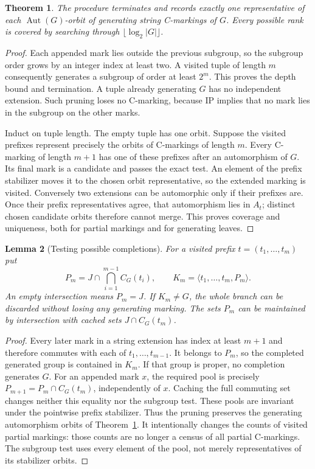 \documentclass[11pt,a4paper]{article}
\newtheorem{theorem}{Theorem}
\newtheorem{lemma}[theorem]{Lemma}
\newcommand{\gen}[1]{\langle#1\rangle}
\begin{document}
\begin{theorem}\label{complete}
The procedure terminates and records exactly one representative of each
$\operatorname{Aut}(G)$-orbit of generating string C-markings of $G$.
Every possible rank is covered by searching through
$\lfloor\log_2|G|\rfloor$.
\end{theorem}
\begin{proof}
Each appended mark lies outside the previous subgroup, so the subgroup
order grows by an integer index at least two. A visited tuple of length
$m$ consequently generates a subgroup of order at least $2^m$.
This proves the depth bound and termination. A tuple already generating
$G$ has no independent extension. Such pruning loses no C-marking,
because IP implies that no mark lies in the subgroup on the other marks.

Induct on tuple length. The empty tuple has one orbit. Suppose the visited
prefixes represent precisely the orbits of C-markings of length $m$.
Every C-marking of length $m+1$ has one of these prefixes after an
automorphism of $G$. Its final mark is a candidate and passes the exact
test. An element of the prefix stabilizer moves it to the chosen orbit
representative, so the extended marking is visited. Conversely two
extensions can be automorphic only if their prefixes are. Once their
prefix representatives agree, that automorphism lies in $A_t$; distinct
chosen candidate orbits therefore cannot merge. This proves coverage and
uniqueness, both for partial markings and for generating leaves.
\end{proof}

\begin{lemma}[Testing possible completions]
For a visited prefix $t=(t_1,\ldots,t_m)$ put
\[
 P_m=J\cap\bigcap_{i=1}^{m-1}C_G(t_i),\qquad
 K_m=\gen{t_1,\ldots,t_m,P_m}.
\]
An empty intersection means $P_m=J$. If $K_m\ne G$, the whole branch
can be discarded without losing any generating marking. The sets $P_m$
can be maintained by intersection with cached sets $J\cap C_G(t_m)$.
\end{lemma}
\begin{proof}
Every later mark in a string extension has index at least $m+1$ and
therefore commutes with each of $t_1,\ldots,t_{m-1}$. It belongs to
$P_m$, so the completed generated group is contained in $K_m$.
If that group is proper, no completion generates $G$.
For an appended mark $x$, the required pool is precisely
$P_{m+1}=P_m\cap C_G(t_m)$, independently of $x$. Caching the full
commuting set changes neither this equality nor the subgroup test.
These pools are invariant under the pointwise prefix stabilizer.
Thus the pruning preserves the generating automorphism orbits of
Theorem~\ref{complete}. It intentionally changes the counts of visited
partial markings: those counts are no longer a census of all partial
C-markings. The subgroup test uses every element of the pool, not merely
representatives of its stabilizer orbits.
\end{proof}
\end{document}
